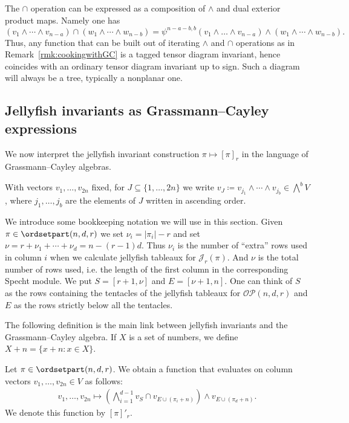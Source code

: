 \begin{remark}\label{rmk:WLOG}
The $\cap$ operation can be expressed as a composition of $\wedge$ and dual exterior product maps. Namely one has 
\[(v_1 \wedge\cdots\wedge v_{n-a}) \cap (w_1 \wedge \cdots \wedge w_{n-b}) = \psi^{n-a-b,b}(v_1\wedge\dots\wedge v_{n-a}) \wedge (w_1 \wedge \cdots \wedge w_{n-b}).\]
Thus, any function that can be built out of iterating $\wedge$ and $\cap$ operations as in Remark~\ref{rmk:cookingwithGC} is a tagged tensor diagram invariant, hence coincides with an ordinary tensor diagram invariant up to sign. Such a diagram will always be a tree, typically a nonplanar one.
\end{remark}



\subsection{Jellyfish invariants as Grassmann--Cayley expressions}
We now interpret the jellyfish invariant construction $\pi \mapsto [\pi]_r$ in the language of Grassmann--Cayley algebras. 

With vectors $v_1,\dots,v_{2n}$ fixed, for $J \subseteq \{1,\ldots,2n\}$ we write $v_J \coloneqq v_{j_1} \wedge \cdots \wedge v_{j_b} \in \bigwedge^b V$, where $j_1,\dots,j_b$ are the elements of $J$ written in ascending order. 

We introduce some bookkeeping notation we will use in this section. Given $\pi \in \ordsetpart(n,d,r)$ we set $\nu_i = |\pi_i| - r$ and set $\nu = r+\nu_1+\cdots +\nu_d = n-(r-1)d$. Thus $\nu_i$ is the number of ``extra'' rows used in column $i$ when we calculate jellyfish tableaux for $\mathcal{J}_r(\pi)$. And $\nu$ is the total number of rows used, i.e. the length of the first column in the corresponding Specht module. 
We put 
$S = [r+1,\nu]$ and $E = [\nu+1,n]$. One can think of $S$ as the rows containing the tentacles of the jellyfish tableaux for $\mathcal{OP}(n,d,r)$ and $E$ as the rows strictly below all the tentacles.


The following definition is the main link between jellyfish invariants and the Grassmann--Cayley algebra. If $X$ is a set of numbers, we define $X+ n = \{ x + n : x \in X\}$.
\begin{definition}
\label{def:web_inv}
Let $\pi \in \ordsetpart(n,d,r)$. We obtain a function that evaluates on column vectors $v_1,\dots,v_{2n} \in V$ as follows: 
\begin{align}\label{eq:meetjellyfish}
v_1,\dots,v_{2n} \mapsto \left(\bigwedge_{i=1}^{d-1} v_{S} \cap v_{E \cup (\pi_i+n)} \right) \wedge v_{E \cup (\pi_d+n)}.
\end{align}
We denote this function by $[\pi]'_r$. 
\end{definition}



